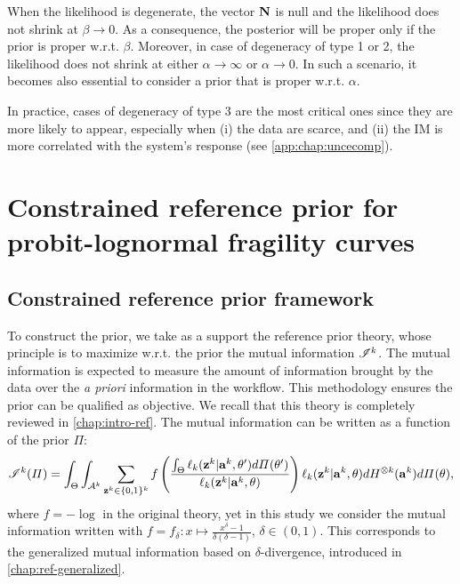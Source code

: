 When the likelihood is degenerate, the vector $\mathbf{N}$ is null and the likelihood does not shrink at $\beta\to0$.
As a consequence, the posterior will be proper only if the prior is proper w.r.t. $\beta$.
Moreover, in case of degeneracy of type 1 or 2, the likelihood does not shrink at either $\alpha\to\infty$ or $\alpha\to0$. In such a scenario, it becomes also essential to consider a prior that is proper  w.r.t. $\alpha$.

In practice, cases of degeneracy of type 3 are the most critical ones since they are more likely to appear, especially when (i) the data are scarce, and (ii) the IM is more correlated with the system's response (see   \cref{app:chap:uncecomp}).


\section{Constrained reference prior for probit-lognormal fragility curves}\label{sec:constr-frags:constrained}


\subsection{Constrained reference prior framework}\label{sec:constr-frags:subsec-constr-frame}



To construct the prior, we take as a support the reference prior theory, whose principle is to maximize w.r.t. the prior the mutual information $\mathscr{I}^k$. The mutual information is expected to measure the amount of information brought by the data over the \emph{a priori} information in the workflow. This methodology ensures the prior can be qualified as objective. We recall that this theory is completely reviewed in   \cref{chap:intro-ref}.
The mutual information can be written as a function of the prior $\varPi$:
\begin{equation}\label{eq:constr-frag:MI}
    \mathscr{I}^k(\varPi) = \int_{\Theta}\int_{\mathcal{A}^k}\sum_{\mathbf{z}^k\in\{0,1\}^k}f\left(\frac{\int_\Theta\ell_k(\mathbf{z}^k|\mathbf{a}^k,\theta')d\varPi(\theta')  }{\ell_k(\mathbf{z}^k|\mathbf{a}^k,\theta)}\right)\ell_k(\mathbf{z}^k|\mathbf{a}^k,\theta)dH^{\otimes k}(\mathbf{a}^k)d\varPi(\theta)  ,    
\end{equation}
where $f=-\log$ in the original theory, yet in this study we consider the mutual information written with $f=f_\delta:x\mapsto\frac{x^\delta-1}{\delta(\delta-1)}$, $\delta\in(0,1)$.
This corresponds to the generalized mutual information 
based on $\delta$-divergence, introduced in   \cref{chap:ref-generalized}. 

